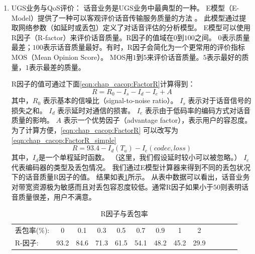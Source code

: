 \begin{enumerate}[(1)]
    \item UGS业务与QoS评价：
        话音业务是UGS业务中最典型的一种。
        E模型（E-Model）提供了一种可以客观评价话音传输服务质量的方法 \cite{ITU:G107}。
        此模型通过提取网络参数（如延时或丢包）定义了对话音评估的分析模型。
        E模型可以使用R因子（R-factor）来评价话音质量。R因子的值域在$0$到$100$之间。
        $0$表示质量最差；$100$表示话音质量最好。有时，R因子会简化为一个更常用的评价指标MOS（Mean Opinion Score）。
        MOS用$1$到$5$来评价话音质量。$5$表示最好的质量，$1$表示最差的质量\cite{NK:IEICE:2005}。

        R因子的值可通过下面\eqref{eqn:chap_cacop:FactorR}计算得到：
\begin{equation}
\label{eqn:chap_cacop:FactorR}
R = R_0 − I_s − I_d − I_e + A 
\end{equation}
其中，$R_0$ 表示基本的信噪比（signal-to-noise ratio）。
$I_s$ 表示对于话音信号的损失之和。
$I_d$ 表示延时对通信的损害。
$I_e$ 表示由于低码率的编码方式对话音质量的影响。
$A$ 表示一个优势因子（advantage factor），表示用户的容忍度。
为了计算方便，\eqref{eqn:chap_cacop:FactorR} 可以改写为\eqref{eqn:chap_cacop:FactorR_simple}
\begin{equation}
R = 93. 4 - I_d ( T_a ) -I_e ( codec, loss )
\label{eqn:chap_cacop:FactorR_simple}
\end{equation}
其中，$I_d$是一个单程延时函数。
（这里，我们假设延时较小可以被忽略。）
$I_e$ 代表编码器的类型及丢包情况。
我们通过E模型计算器来得到不同的丢包状况下的话音质量R因子的值\cite{ITU:EModel:Caculator}。 
结果如表\ref{tb:R_factor}所示。
从表中数据可以看出，话音业务对带宽资源极为敏感而且对丢包容忍度较低。通常R因子如果小于$50$则表明话音质量很差，用户不满意。


\begin{table}[tb]
\caption{R因子与丢包率} \label{tb:R_factor}
\begin{center}
\begin{tabular*}{0.7\textwidth}{lcccccccccccc}
\toprule 
丢包率(\%):& 0& 0.1& 0.3& 0.5& 0.7& 0.9& 1& 2\\
R-因子: &93.2& 84.6& 71.3& 61.5& 54.1& 48.2& 45.2& 29.9\\ 
\bottomrule
\end{tabular*}
\end{center}
\end{table}


\end{enumerate}
